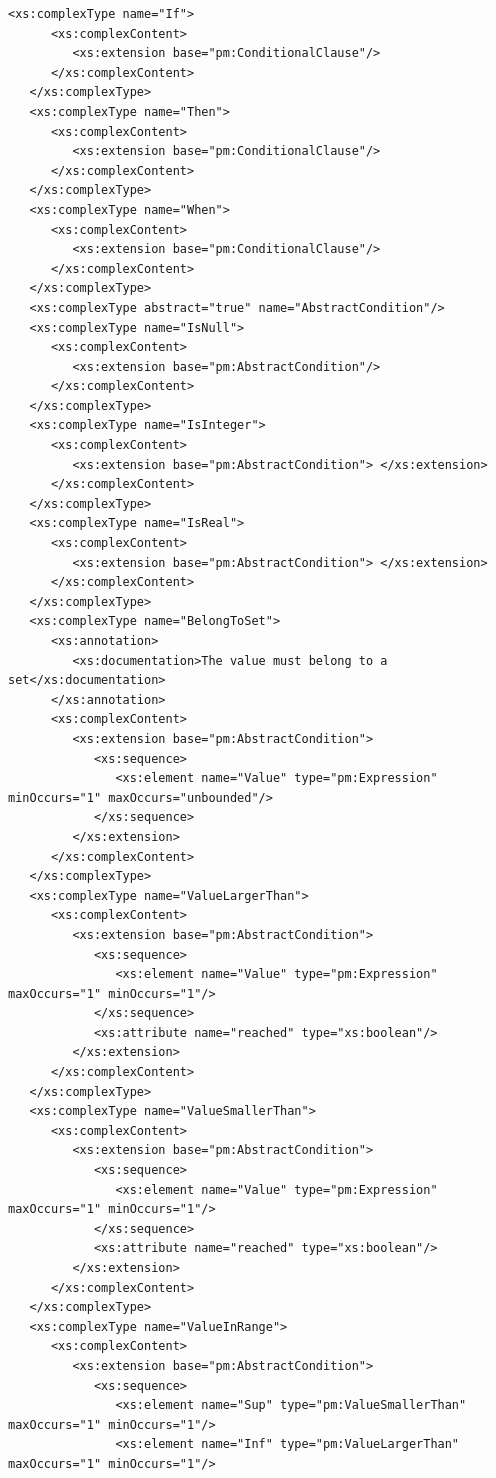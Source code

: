 \documentclass[a4paper,11pt] {ivoa}
\begin{document}
\begin{lstlisting}[style=listXML]
   <xs:complexType name="If">
      <xs:complexContent>
         <xs:extension base="pm:ConditionalClause"/>
      </xs:complexContent>
   </xs:complexType>
   <xs:complexType name="Then">
      <xs:complexContent>
         <xs:extension base="pm:ConditionalClause"/>
      </xs:complexContent>
   </xs:complexType>
   <xs:complexType name="When">
      <xs:complexContent>
         <xs:extension base="pm:ConditionalClause"/>
      </xs:complexContent>
   </xs:complexType>
   <xs:complexType abstract="true" name="AbstractCondition"/>
   <xs:complexType name="IsNull">
      <xs:complexContent>
         <xs:extension base="pm:AbstractCondition"/>
      </xs:complexContent>
   </xs:complexType>
   <xs:complexType name="IsInteger">
      <xs:complexContent>
         <xs:extension base="pm:AbstractCondition"> </xs:extension>
      </xs:complexContent>
   </xs:complexType>
   <xs:complexType name="IsReal">
      <xs:complexContent>
         <xs:extension base="pm:AbstractCondition"> </xs:extension>
      </xs:complexContent>
   </xs:complexType>
   <xs:complexType name="BelongToSet">
      <xs:annotation>
         <xs:documentation>The value must belong to a set</xs:documentation>
      </xs:annotation>
      <xs:complexContent>
         <xs:extension base="pm:AbstractCondition">
            <xs:sequence>
               <xs:element name="Value" type="pm:Expression" minOccurs="1" maxOccurs="unbounded"/>
            </xs:sequence>
         </xs:extension>
      </xs:complexContent>
   </xs:complexType>
   <xs:complexType name="ValueLargerThan">
      <xs:complexContent>
         <xs:extension base="pm:AbstractCondition">
            <xs:sequence>
               <xs:element name="Value" type="pm:Expression" maxOccurs="1" minOccurs="1"/>
            </xs:sequence>
            <xs:attribute name="reached" type="xs:boolean"/>
         </xs:extension>
      </xs:complexContent>
   </xs:complexType>
   <xs:complexType name="ValueSmallerThan">
      <xs:complexContent>
         <xs:extension base="pm:AbstractCondition">
            <xs:sequence>
               <xs:element name="Value" type="pm:Expression" maxOccurs="1" minOccurs="1"/>
            </xs:sequence>
            <xs:attribute name="reached" type="xs:boolean"/>
         </xs:extension>
      </xs:complexContent>
   </xs:complexType>
   <xs:complexType name="ValueInRange">
      <xs:complexContent>
         <xs:extension base="pm:AbstractCondition">
            <xs:sequence>
               <xs:element name="Sup" type="pm:ValueSmallerThan" maxOccurs="1" minOccurs="1"/>
               <xs:element name="Inf" type="pm:ValueLargerThan" maxOccurs="1" minOccurs="1"/>

\end{lstlisting}
\end{document}
